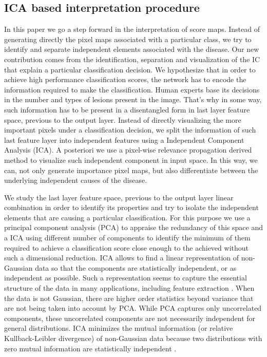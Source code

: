 \documentclass[preprint]{elsarticle}
\theoremstyle{definition} %
\theoremstyle{remark}
\begin{document}
\subsection{ICA based interpretation procedure}

In this paper we go a step forward in the interpretation of score maps. Instead of generating directly the pixel maps associated with a particular class, we try to identify and separate independent elements associated with the disease. Our new contribution comes from the identification, separation and visualization of the IC that explain a particular classification decision. We hypothesize that in order to achieve high performance classification scores, the network has to encode the information required to make the classification. Human experts base its decisions in the number and types of lesions present in the image. That's why in some way, such information has to be present in a disentangled form in last layer feature space, previous to the output layer.  Instead of directly visualizing the more important pixels under a classification decision, we split the information of such last feature layer into independent features using a Independent Component Analysis (ICA). A posteriori we use a pixel-wise relevance propagation derived method to visualize such independent component in input space. In this way, we can, not only generate importance pixel maps, but also differentiate between the underlying independent causes of the disease.

We study the last layer feature space, previous to the output layer linear combination in order to identify its properties and try to isolate the independent elements that are causing a particular classification. For this purpose we use a principal component analysis (PCA)  \citep{pearson1901principal} to appraise the redundancy of this space and a ICA \citep{hyvarinen2000independent} using different number of components to identify the minimum of them required to achieve a classification score close enough to the achieved without such a dimensional reduction.  ICA allows to find a linear representation of non-Gaussian data so that the components are statistically independent, or as independent as possible. Such a representation seems to capture the essential structure of the data in many applications, including feature extraction \citep{hyvarinen2000independent}. When the data is not Gaussian, there are higher order statistics beyond variance that are not being taken into account by PCA. While PCA captures only uncorrelated components, these uncorrelated components are not necessarily independent for general distributions. ICA minimizes the mutual information (or relative Kullback-Leibler divergence) of non-Gaussian data because two distributions with zero mutual information are statistically independent \citep{comon1992independent}. 
\end{document}
